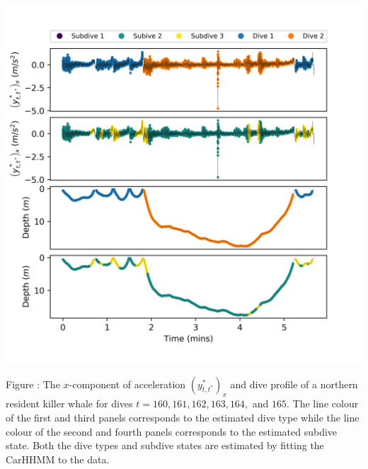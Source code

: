 \documentclass{article}
\begin{document}
        \begin{center}
        \includegraphics[width=6in]{../Plots/CarHHMM1_decoded_dives.png}
        \end{center}
        
        \noindent Figure : The $x$-component of acceleration $\left(y^*_{t,t^*}\right)_x$ and dive profile of a northern resident killer whale for dives $t = 160,161,162,163,164,$ and $165$. The line colour of the first and third panels corresponds to the estimated dive type while the line colour of the second and fourth panels corresponds to the estimated subdive state. Both the dive types and subdive states are estimated by fitting the CarHHMM to the data.
        \addtocounter{fignum}{1}
        
\end{document}
